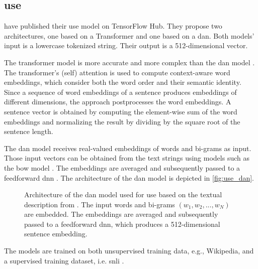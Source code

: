 \subsection{\acl*{use}}\label{subsec:univ-sent-encoder}

\citeauthor{UniversalSentEnc2018} have published their \ac{use} model on TensorFlow Hub.
They propose two architectures, one based on a Transformer and one based on a \ac{dan}.
Both models' input is a lowercase tokenized string.
Their output is a 512-dimensional vector.

The transformer model is more accurate and more complex than the \ac{dan} model \cite{UniversalSentEnc2018}.
The transformer's (self) attention is used to compute context-aware word embeddings, which consider both the word order and their semantic identity.
Since a sequence of word embeddings of a sentence produces embeddings of different dimensions, the approach postprocesses the word embeddings.
A sentence vector is obtained by computing the element-wise sum of the word embeddings 
and normalizing the result by dividing by the square root of the sentence length.

The \ac{dan} model receives real-valued embeddings of words and bi-grams as input.
Those input vectors can be obtained from the text strings using models such as the \ac{bow} model \cite{UniversalSentEnc-dan-input-emb}.
The embeddings are averaged and subsequently passed to a feedforward \ac{dnn} \cite{UniversalSentEnc2018}.
The architecture of the \ac{dan} model is depicted in \autoref{fig:use_dan}.

\begin{figure}[!htb] %
    \centering
    
    \caption[Architecture of \ac{use}]{Architecture of the \ac{dan} model used for \ac{use} based on the textual description from \cite{inferSent2018}.
    The input words and bi-grams $(w_1, w_2, ..., w_N)$ are embedded.
    The embeddings are averaged and subsequently passed to a feedforward \ac{dnn}, which produces a 512-dimensional sentence embedding.
    }
    \label{fig:use_dan}
\end{figure}

The models are trained on both unsupervised training data, e.g., Wikipedia, and a supervised training dataset, i.e. \ac{snli} \cite{UniversalSentEnc2018, HfsentTrans2019}.

